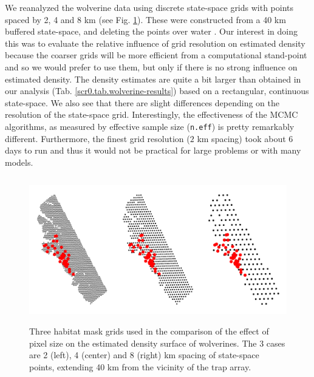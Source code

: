 We reanalyzed the wolverine data using discrete state-space grids with
points spaced by 2, 4 and 8 km (see
Fig. \ref{scr0.fig.wolvgrids}). These were constructed from a 40 km
buffered state-space, and deleting the points over water
\citep[see][]{royle_etal:2011jwm}.  Our interest in doing this was to
evaluate the relative influence of grid resolution on estimated
density because the coarser grids will be more efficient from a
computational stand-point and so we would prefer to use them, but
only if there is no strong influence on estimated density.
The density estimates are quite a bit larger than obtained in our
analysis
(Tab. \ref{scr0.tab.wolverine-results})
based on a rectangular, continuous state-space.
We also see that there are slight differences depending on the
resolution of the state-space grid.
Interestingly, the
effectiveness of the MCMC algorithms, as measured by effective sample
size (\mbox{\tt n.eff}) is pretty remarkably
different. Furthermore, the finest grid resolution ($2$ km spacing) took about
6 days to run and thus it would not be practical for large problems or
with many models.

\begin{figure}[ht]
\begin{center}
\includegraphics[height=2.5in,width=5in]{Ch4-SCR0/figs/wolvgrids}
\end{center}
\caption{Three habitat mask grids used in the comparison of the effect of pixel size on the estimated
  density surface of wolverines.  The 3 cases are
2 (left), 4 (center) and 8 (right) km spacing of state-space points, extending
40 km from the vicinity of the trap array. }
\label{scr0.fig.wolvgrids}
\end{figure}


